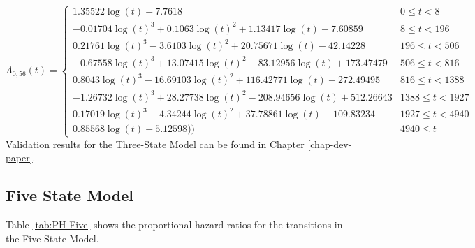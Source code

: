 \documentclass[12pt,PhD,twoside,openright]{muthesis}
\begin{document}
\begin{equation}
\Lambda_{0,56}(t)=\begin{cases} 1.35522\log(t)-7.7618 & 0 \le t < 8 \\ -0.01704\log(t)^3+0.1063\log(t)^2+1.13417\log(t)-7.60859 & 8 \le t < 196 \\ 0.21761\log(t)^3-3.6103\log(t)^2+20.75671\log(t)-42.14228 & 196 \le t < 506 \\ -0.67558\log(t)^3+13.07415\log(t)^2-83.12956\log(t)+173.47479 & 506 \le t < 816 \\ 0.8043\log(t)^3-16.69103\log(t)^2+116.42771\log(t)-272.49495 & 816 \le t < 1388 \\ -1.26732\log(t)^3+28.27738\log(t)^2-208.94656\log(t)+512.26643 & 1388 \le t < 1927 \\ 0.17019\log(t)^3-4.34244\log(t)^2+37.78861\log(t)-109.83234 & 1927 \le t < 4940 \\ 0.85568\log(t)-5.12598)) & 4940 \le t \label{eq:CH-Three-56}\end{cases}
\end{equation}
Validation results for the Three-State Model can be found in Chapter \ref{chap-dev-paper}.

\hypertarget{five-state-model}{%
\subsection{Five State Model}\label{five-state-model}}

Table \ref{tab:PH-Five} shows the proportional hazard ratios for the transitions in the Five-State Model.
\end{document}
